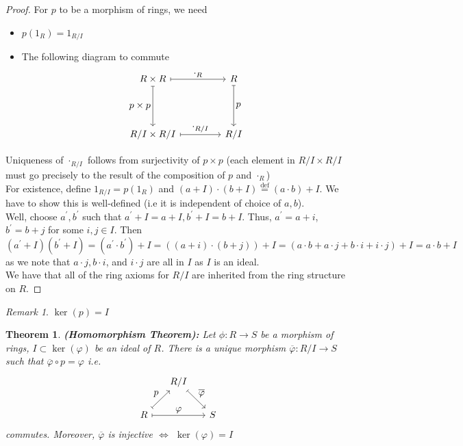 \documentclass{amsart}
\newcommand{\defeq}						    %
{\overset{\textrm{def}}{=}}
\newtheorem{thm}{Theorem}[section]
\theoremstyle{definition}
\theoremstyle{remark}
\newtheorem*{rmk}{Remark}
\begin{document}
\begin{proof}
    For $p$ to be a morphism of rings, we need
    \begin{itemize}
        \item $p(1_R) = 1_{R/I}$
        \item The following diagram to commute
        \[ \begin{tikzcd}[%
        ,every arrow/.append style={maps to}
        ,every label/.append style={font=\normalsize}
        ,row sep=1.5cm
        ,column sep=1.5cm]
        R \times R \arrow{r}{\cdot_R} \arrow[swap]{d}{p \times p} & R \arrow{d}{p} \\%
        R/I \times R/I \arrow{r}{\cdot_{R/I}}& R/I
        \end{tikzcd}
        \]
    \end{itemize}
    Uniqueness of $\cdot_{R/I}$ follows from surjectivity of $p \times p$ (each element
    in $R / I \times R/I$ must go precisely to the result of the composition of $p$ and
    $\cdot_R$) \\
    For existence, define $1_{R/I} = p(1_R)$ and $(a + I) \cdot (b + I) \defeq (a \cdot b) + I$.
    We have to show this is well-defined (i.e it is independent of choice of $a, b$). \\
    Well, choose $a^\prime, b^\prime$ such that $a^\prime  + I = a + I, b^\prime + I = b + I$.
    Thus, $a^\prime = a + i$, $b^\prime = b + j$ for some $i, j \in I$. Then
    $$
    (a^\prime + I)(b^\prime + I) = (a^\prime \cdot b^\prime) + I = ((a + i)\cdot(b + j)) + I =
    (a\cdot b + a \cdot j + b \cdot i + i \cdot j) + I = a\cdot b + I
    $$
    as we note that $a \cdot j, b \cdot i$, and $i \cdot j$ are all in $I$ as $I$
    is an ideal. \\
    We have that all of the ring axioms for $R / I$ are inherited from the ring
    structure on $R$.
\end{proof}
\begin{rmk}
    $\ker(p) = I$
\end{rmk}
\begin{thm} \textbf{(Homomorphism Theorem):}
    Let $\phi: R \rightarrow S$ be a morphism of rings, $I \subset \ker(\varphi)$ be
    an ideal of $R$. There is a unique morphism $\overline{\varphi}: R/I \rightarrow S$
    such that $\overline{\varphi} \circ p = \varphi$ i.e.
    \[
\begin{tikzcd}[,every arrow/.append style={maps to}
,every label/.append style={font=\normalsize},column sep=1.5em]
 & R/I \arrow{dr}{\overline{\varphi}} \\
R \arrow{ur}{p} \arrow{rr}{\varphi} && S
\end{tikzcd}
\]
commutes. Moreover, $\overline{\varphi}$ is injective $\iff$ $\ker(\varphi) = I$
\end{thm}
\end{document}
